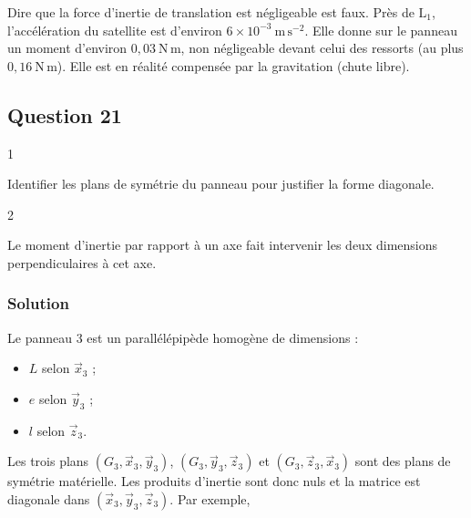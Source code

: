 \documentclass[11pt,a4paper]{article}
\providecommand{\tightlist}{\setlength{\itemsep}{0pt}\setlength{\parskip}{0pt}}
\begin{document}
\begin{piege}

Dire que la force d'inertie de translation est négligeable est faux. Près de \(\mathrm L_1\), l'accélération du satellite est d'environ \(6\times10^{-3}\ \mathrm{m\,s^{-2}}\). Elle donne sur le panneau un moment d'environ \(0{,}03\ \mathrm{N\,m}\), non négligeable devant celui des ressorts (au plus \(0{,}16\ \mathrm{N\,m}\)). Elle est en réalité compensée par la gravitation (chute libre).

\end{piege}

\hypertarget{question-21}{%
\subsection{Question 21}\label{question-21}}

\begin{indication}{1}

Identifier les plans de symétrie du panneau pour justifier la forme diagonale.

\end{indication}

\begin{indication}{2}

Le moment d'inertie par rapport à un axe fait intervenir les deux dimensions perpendiculaires à cet axe.

\end{indication}

\hypertarget{solution-20}{%
\subsubsection{Solution}\label{solution-20}}

Le panneau 3 est un parallélépipède homogène de dimensions :

\begin{itemize}
\tightlist
\item
  \(L\) selon \(\vec x_3\) ;
\item
  \(e\) selon \(\vec y_3\) ;
\item
  \(l\) selon \(\vec z_3\).
\end{itemize}

Les trois plans \((G_3,\vec x_3,\vec y_3)\), \((G_3,\vec y_3,\vec z_3)\) et \((G_3,\vec z_3,\vec x_3)\) sont des plans de symétrie matérielle. Les produits d'inertie sont donc nuls et la matrice est diagonale dans \((\vec x_3,\vec y_3,\vec z_3)\). Par exemple,
\end{document}
